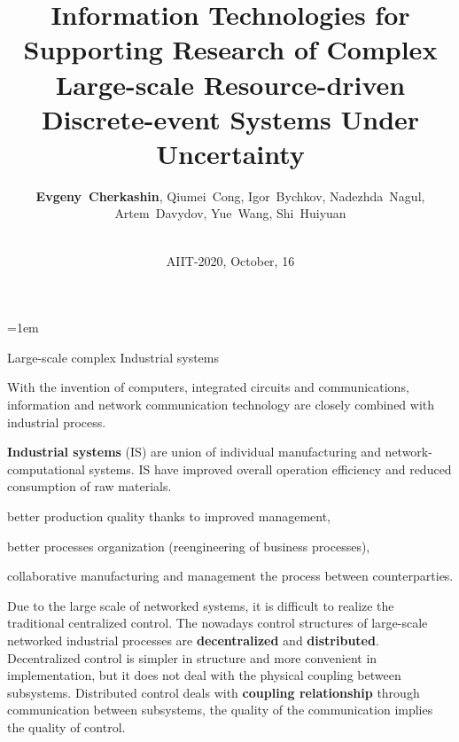 \documentclass[10pt,dvipsnames]{beamer}
\def\remph#1{\textcolor{Mahogany}{\bfseries #1}}
\begin{document}
\parindent=1em
\title[Supporting IT for Large-scale Resource-driven DES Research]{Information Technologies for Supporting Research of Complex Large-scale Resource-driven Discrete-event Systems Under Uncertainty}
\author[E.~Cherkashin, Q.~Cong, I.~Bychkov, N.~Nagul, A.~Davydov, Y.~Wang, Sh.~Huiyuan]{
\def\and{, }
\remph{Evgeny~Cherkashin}\and
Qiumei~Cong\and
Igor~Bychkov\and
Nadezhda~Nagul\and
Artem~Davydov\and
Yue~Wang\and
Shi~Huiyuan}

\date{${}$\\\vspace{2em}AIIT-2020, October, 16}
\maketitle
\begin{frame}{Large-scale complex Industrial systems}

  With the invention of computers, integrated circuits and communications, information and network communication technology are closely combined with industrial process.

  \remph{Industrial systems} (IS) are union of individual manufacturing and network-computational systems. IS have improved overall operation efficiency and reduced consumption of raw materials.
  \begin{description} \color{MidnightBlue}
  \item[1980-th] better production quality thanks to improved management,
  \item[1990-th] better processes organization (reengineering of business processes),
  \item[2000-th] collaborative manufacturing and management the process between counterparties.
  \end{description}

  Due to the large scale of networked systems, it is difficult to realize the traditional centralized control. The nowadays control structures of large-scale networked industrial processes are \remph{decentralized} and \remph{distributed}.  Decentralized control is simpler in structure and more convenient in implementation, but it does not deal with the physical coupling between subsystems.  Distributed control deals with \remph{coupling relationship} through communication between subsystems, the quality of the communication implies the quality of control.

\end{frame}
\end{document}

